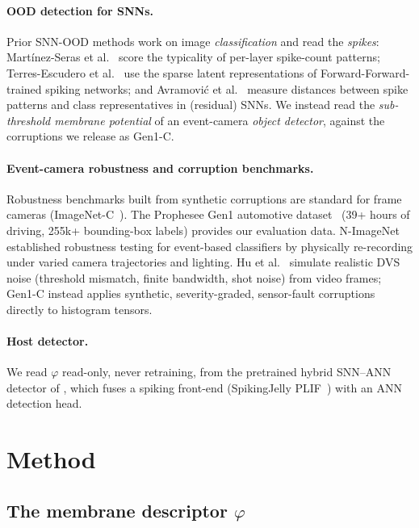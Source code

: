 ﻿\documentclass{article} %
\theoremstyle{remark}
\begin{document}
\paragraph{OOD detection for SNNs.}
Prior SNN-OOD methods work on image \emph{classification} and read the \emph{spikes}:
Mart\'inez-Seras et al.~\citep{martinez2023snnood} score the typicality of per-layer spike-count
patterns; Terres-Escudero et al.~\citep{terres2024forwardforward} use the sparse latent
representations of Forward-Forward-trained spiking networks; and Avramovi\'c et
al.~\citep{avramovic2025distance,avramovic2025residual} measure distances between spike patterns and
class representatives in (residual) SNNs. We instead read the \emph{sub-threshold membrane
potential} of an event-camera \emph{object detector}, against the corruptions we release as Gen1-C.

\paragraph{Event-camera robustness and corruption benchmarks.}
Robustness benchmarks built from synthetic corruptions are standard for frame cameras
(ImageNet-C~\citep{hendrycks2019imagenetc}). The Prophesee Gen1 automotive
dataset~\citep{detournemire2020gen1} (39+ hours of driving, 255k+ bounding-box labels) provides our
evaluation data. N-ImageNet~\citep{kim2021nimagenet} established robustness testing for
event-based classifiers by physically re-recording under varied camera trajectories and lighting.
Hu et al.~\citep{hu2021v2e} simulate realistic DVS noise (threshold mismatch, finite bandwidth,
shot noise) from video frames; Gen1-C instead applies synthetic, severity-graded, sensor-fault
corruptions directly to histogram tensors.

\paragraph{Host detector.}
We read $\varphi$ read-only, never retraining, from the pretrained hybrid SNN--ANN detector of
\citet{ahmed2025hybrid}, which fuses a spiking front-end
(SpikingJelly PLIF~\citep{fang2021plif}) with an ANN detection head.

\section{Method}
\label{sec:method}

\subsection{The membrane descriptor \texorpdfstring{$\varphi$}{phi}}
\label{sec:phi}
\end{document}
